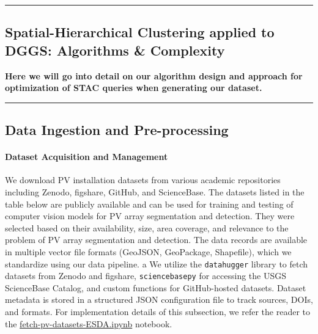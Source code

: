 {\color{gray}\hrule}
\begin{center}
\section{Spatial-Hierarchical Clustering applied to DGGS: Algorithms \& Complexity}
\textbf{Here we will go into detail on our algorithm design and approach for optimization of STAC queries when generating our dataset.}
\bigskip
\end{center}
{\color{gray}\hrule}


\subsection{Data Ingestion and Pre-processing}
\label{subsec:data_ingestion}

\paragraph{Dataset Acquisition and Management} 
We download PV installation datasets from various academic repositories including Zenodo, figshare, GitHub, and ScienceBase. 
The datasets listed in the table below are publicly available and can be used for training and testing of computer vision models for PV array segmentation and detection. 
They were selected based on their availability, size, area coverage, and relevance to the problem of PV array segmentation and detection.
The data records are available in multiple vector file formats (GeoJSON, GeoPackage, Shapefile), which we standardize using our data pipeline. a
We utilize the \texttt{datahugger} library to fetch datasets from Zenodo and figshare, \texttt{sciencebasepy} for accessing the USGS ScienceBase Catalog, 
and custom functions for GitHub-hosted datasets. Dataset metadata is stored in a structured JSON configuration file to track sources, DOIs, and formats. 
For implementation details of this subsection, we refer the reader to the \href{https://github.com/avega17/CCOM_MS_Spring_2025_EO_PV_research/blob/main/fetch-pv-datasets-ESDA.ipynb}{fetch-pv-datasets-ESDA.ipynb} notebook.

